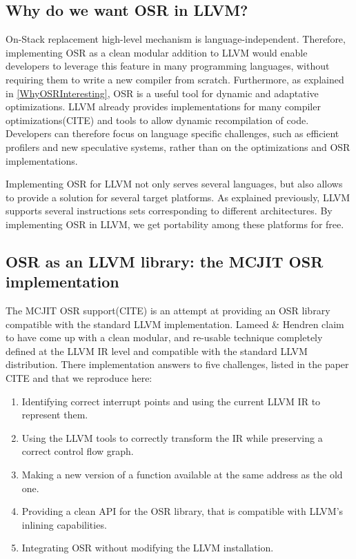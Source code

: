 \subsection{Why do we want OSR in LLVM?}

On-Stack replacement high-level mechanism is language-independent.
Therefore, implementing OSR as a clean modular addition to LLVM would enable developers to leverage this feature in many programming languages, without requiring them to write a new compiler from scratch.
Furthermore, as explained in \ref{WhyOSRInteresting}, OSR is a useful tool for dynamic and adaptative optimizations.
LLVM already provides implementations for many compiler optimizations(CITE) and tools to allow dynamic recompilation of code.
Developers can therefore focus on language specific challenges, such as efficient profilers and new speculative systems, rather than on the optimizations and OSR implementations.

Implementing OSR for LLVM not only serves several languages, but also allows to provide a solution for several target platforms.
As explained previously, LLVM supports several instructions sets corresponding to different architectures.
By implementing OSR in LLVM, we get portability among these platforms for free.\\

\subsection{OSR as an LLVM library: the MCJIT OSR implementation}\label{McJIT}
The MCJIT OSR support(CITE) is an attempt at providing an OSR library compatible with the standard LLVM implementation.
Lameed \& Hendren claim to have come up with a clean modular, and re-usable technique completely defined at the LLVM IR level and compatible with the standard LLVM distribution.
There implementation answers to five challenges, listed in the paper CITE and that we reproduce here:\\ 

\begin{enumerate}
    \item Identifying correct interrupt points and using the current LLVM IR to represent them.
    \item Using the LLVM tools to correctly transform the IR while preserving a correct control flow graph. 
    \item Making a new version of a function available at the same address as the old one.
    \item Providing a clean API for the OSR library, that is compatible with LLVM's inlining capabilities.
    \item Integrating OSR without modifying the LLVM installation.
\end{enumerate}

